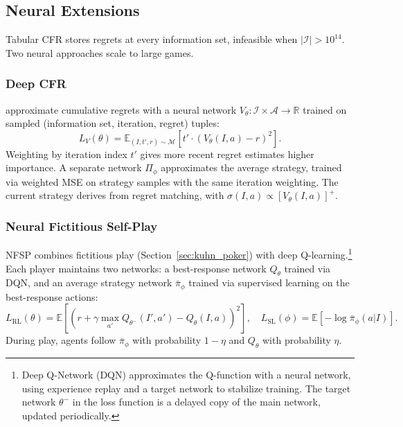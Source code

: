\subsection{Neural Extensions}

Tabular CFR stores regrets at every information set, infeasible when $|\mathcal{I}| > 10^{14}$. Two neural approaches scale to large games.

\subsubsection{Deep CFR}

\citet{Brown2019} approximate cumulative regrets with a neural network $V_\theta: \mathcal{I} \times \mathcal{A} \to \mathbb{R}$ trained on sampled (information set, iteration, regret) tuples:
\begin{equation}
L_V(\theta) = \mathbb{E}_{(I, t', r) \sim \mathcal{M}} \left[ t' \cdot (V_\theta(I, a) - r)^2 \right].
\end{equation}
Weighting by iteration index $t'$ gives more recent regret estimates higher importance.
A separate network $\Pi_\phi$ approximates the average strategy, trained via weighted MSE on strategy samples with the same iteration weighting. The current strategy derives from regret matching, with $\sigma(I, a) \propto [V_\theta(I, a)]^+$.

\subsubsection{Neural Fictitious Self-Play}

NFSP \citep{heinrich2016deep} combines fictitious play (Section~\ref{sec:kuhn_poker}) with deep Q-learning.\footnote{Deep Q-Network (DQN) \citep{mnih2015} approximates the Q-function with a neural network, using experience replay and a target network to stabilize training. The target network $\theta^-$ in the loss function is a delayed copy of the main network, updated periodically.} Each player maintains two networks: a best-response network $Q_\theta$ trained via DQN, and an average strategy network $\bar{\pi}_\phi$ trained via supervised learning on the best-response actions:
\begin{equation}
L_{\text{RL}}(\theta) = \mathbb{E}\left[ \left( r + \gamma \max_{a'} Q_{\theta^-}(I', a') - Q_\theta(I, a) \right)^2 \right], \quad
L_{\text{SL}}(\phi) = \mathbb{E}\left[ -\log \bar{\pi}_\phi(a | I) \right].
\end{equation}
During play, agents follow $\bar{\pi}_\phi$ with probability $1-\eta$ and $Q_\theta$ with probability $\eta$.

